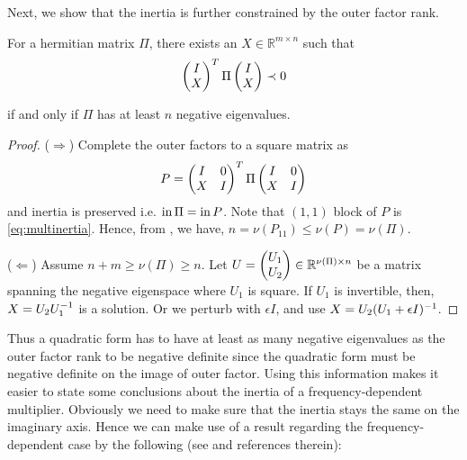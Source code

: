 Next, we show that the inertia is further constrained by the outer factor rank. 
\begin{lem}\label{lem:inertialemma} For a hermitian matrix $\Pi$, there exists an $X\in \mathbb{R}^{m\times n}$ such that 
\begin{equation}
\begin{pmatrix}I\\X\end{pmatrix}^T\Pi\begin{pmatrix}I\\X\end{pmatrix} \prec 0
\label{eq:multinertia}
\end{equation}

if and only if $\Pi$ has at least $n$ negative eigenvalues.
\end{lem}

\begin{proof} ($\Rightarrow$) Complete the outer factors to a square matrix as
\[
P = \begin{pmatrix}I &0\\X &I\end{pmatrix}^T\Pi\begin{pmatrix}I &0\\X &I\end{pmatrix}
\]
and inertia is preserved i.e. $\operatorname{in} \Pi = \operatorname{in} P$. Note that $(1,1)$ block of $P$ is \eqref{eq:multinertia}. 
Hence, from , we have, $n = \nu(P_{11})\leq \nu({P}) = \nu(\Pi)$.


($\Leftarrow$) Assume $n+m \geq \nu(\Pi)\geq n$. Let $U = \begin{pmatrix}U_1\\U_2\end{pmatrix} \in\mathbb{R}^{\nu(\Pi)\times n}$ be a 
matrix spanning the negative eigenspace where $U_1$ is square. If $U_1$ is invertible, then, $X = U_2U_1^{-1}$ 
is a solution. Or we perturb with $\epsilon I$, and use $X= U_2(U_1+\epsilon I)^{-1}$. 
\end{proof}
Thus a quadratic form has to have at least as many negative eigenvalues as the outer factor rank to be negative definite
since the quadratic form must be negative definite on the image of outer factor. 
Using this information makes it easier to state some conclusions about the inertia of a frequency-dependent multiplier. 
Obviously we need to make sure that the inertia stays the same on the imaginary axis. Hence we can make use of a result 
regarding the frequency-dependent case by the following (see \cite{megretskitreil} and references therein):

